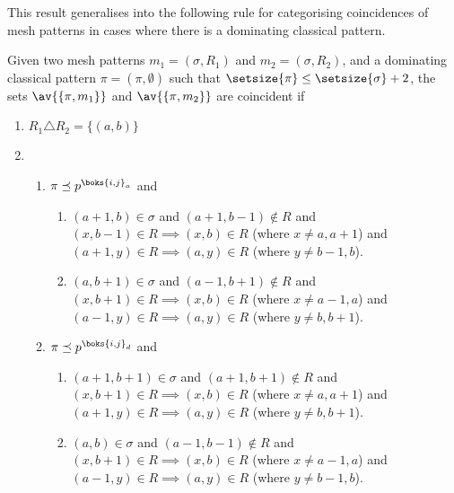 This result generalises into the following rule for categorising coincidences
of mesh patterns in cases where there is a dominating classical pattern.

\begin{proposition}
    \label{prop:dom2}
    Given two mesh patterns \(m_1 =(\sigma, R_1)\) and \(m_2 = (\sigma, R_2)\),
    and a dominating classical pattern \(\pi = (\pi,\emptyset)\) such that
    \(\setsize{\pi} \le \setsize{\sigma} + 2\), the sets \(\av{\{\pi,m_1\}}\) and
    \(\av{\{\pi,m_2\}}\) are coincident if

    \begin{enumerate}
        \item \(R_1 \triangle R_2 = \{(a,b)\}\)
        \item   \begin{enumerate}
                \item\label{prop:dom2:condc} \(\pi \preceq p^{\boks{i,j}_a}\) and
                        \begin{enumerate}
                            \item \((a+1,b) \in \sigma\) and \((a+1,b-1)\notin R\) and \\
                                \((x,b-1)\in R \implies (x,b) \in R \) (where \(x\neq a,a+1\)) and\\
                                  \((a+1,y)\in R \implies (a,y) \in R\) (where \(y\neq b-1,b\)).
                            \item \((a,b+1) \in \sigma\) and \((a-1,b+1)\notin R\) and \\
                                  \((x,b+1)\in R \implies (x,b) \in R\) (where \(x\neq a-1,a\)) and\\
                                  \((a-1,y)\in R \implies (a,y) \in R\) (where \(y\neq b,b+1\)).
                        \end{enumerate}
                    \item \(\pi \preceq p^{\boks{i,j}_d}\) and
                        \begin{enumerate}
                            \item \((a+1,b+1) \in \sigma\) and \((a+1,b+1)\notin R\) and \\
                                  \((x,b+1)\in R \implies (x,b) \in R\) (where \(x\neq a,a+1\)) and\\
                                  \((a+1,y)\in R \implies (a,y) \in R\) (where \(y\neq b,b+1\)).
                            \item \((a,b) \in \sigma\) and \((a-1,b-1)\notin R\) and \\
                                  \((x,b+1)\in R \implies (x,b) \in R\) (where \(x\neq a-1,a\)) and\\
                                  \((a-1,y)\in R \implies (a,y) \in R\)  (where \(y\neq b-1,b\)).
                        \end{enumerate}
                \end{enumerate}
    \end{enumerate}
\end{proposition}
